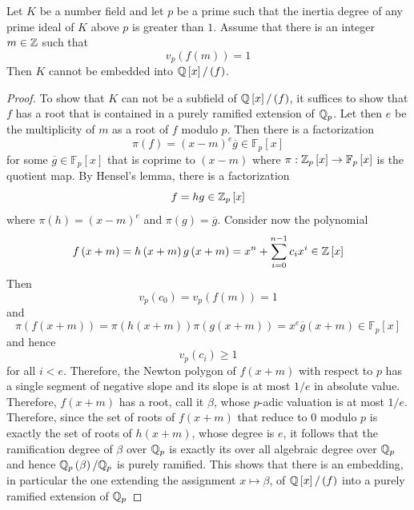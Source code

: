 \documentclass[../main.tex]{subfiles}
\begin{document}
\begin{lemma}
  \label{lem:imprimitivity_finite_obstruction}
  Let $K$ be a number field and let $p$ be a prime such that the inertia degree of any prime ideal of $K$ above $p$ is greater than $1$.
  Assume that there is an integer $m \in \mathbb{Z}$ such that 
  \[
    v_p\left( f\left( m \right) \right) = 1
  \]
  Then $K$ cannot be embedded into $\mathbb{Q}\left[ x \right] / \left( f \right)$.
\end{lemma}
\begin{proof}
  To show that $K$ can not be a subfield of $\mathbb{Q}\left[ x \right] / \left( f \right)$, it suffices to show that $f$ has a root that is contained in a purely ramified extension of $\mathbb{Q}_p$.
  Let then $e$ be the multiplicity of $m$ as a root of $f$ modulo $p$.
  Then there is a factorization 
    \[
      \pi\left( f \right) = \left( x-m \right)^e \overline{g} \in \mathbb{F}_p\left[ x \right]
    \]
    for some $\overline{g} \in \mathbb{F}_p\left[ x \right]$ that is coprime to $\left( x-m \right)$ where $\pi : \mathbb{Z}_p\left[ x \right] \to \mathbb{F}_p\left[ x \right]$ is the quotient map.
    By Hensel's lemma, there is a factorization
    \[
      f = h g \in \mathbb{Z}_p\left[ x \right]
    \]
    where $\pi\left( h \right) = \left( x-m \right)^e$ and $\pi\left( g \right) = \overline{g}$.
    Consider now the polynomial 
    \[
      f\left( x + m \right) = 
      h\left( x + m \right)g\left( x + m \right) = x^n + \sum_{i=0}^{n-1} c_i x^i \in \mathbb{Z}\left[ x \right]  
    \]
    Then 
    \[
      v_p\left( c_0 \right) = v_p\left( f\left( m \right) \right) = 1
    \]
    and 
    \[
      \pi\left( f\left( x + m \right) \right) = 
      \pi\left( h\left( x + m \right) \right) \pi\left( g\left( x + m \right) \right) =
      x^e \overline{g}\left( x + m \right) \in \mathbb{F}_p\left[ x \right]
    \]
    and hence 
    \[
      v_p\left( c_i \right) \geq 1
    \]
    for all $i < e$.
    Therefore, the Newton polygon of $f\left( x + m \right)$ with respect to $p$ has a single segment of negative slope and its slope is at most $1/e$ in absolute value.
    Therefore, $f\left( x + m \right)$ has a root, call it $\beta$, whose $p$-adic valuation is at most $1/e$.
    Therefore, since the set of roots of $f\left( x + m \right)$ that reduce to $0$ modulo $p$ is exactly the set of roots of $h\left( x + m \right)$, whose degree is $e$, it follows that the ramification degree of $\beta$ over $\mathbb{Q}_p$ is exactly its over all algebraic degree over $\mathbb{Q}_p$ and hence $\mathbb{Q}_p\left( \beta \right) / \mathbb{Q}_p$ is purely ramified.
    This shows that there is an embedding, in particular the one extending the assignment $x \mapsto \beta$, of $\mathbb{Q}\left[ x \right] / \left( f \right)$ into a purely ramified extension of $\mathbb{Q}_p$  
\end{proof}
\end{document}
